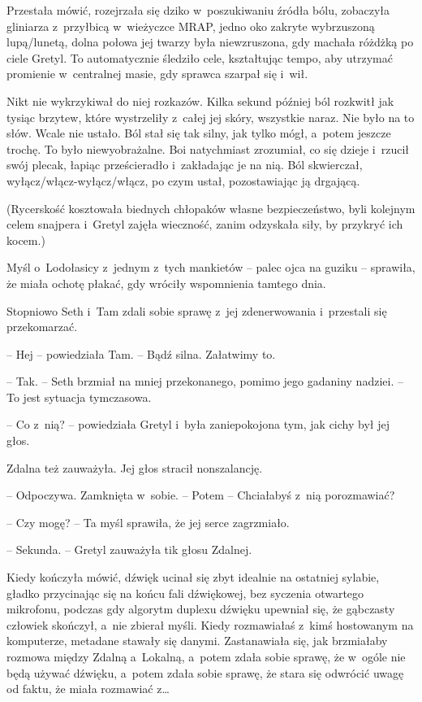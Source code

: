 \documentclass[oneside,polish,11pt,sfheadings]{mwbk}
\begin{document}
Przestała mówić, rozejrzała się dziko w~poszukiwaniu źródła bólu,
zobaczyła gliniarza z~przyłbicą w~wieżyczce MRAP, jedno oko zakryte
wybrzuszoną lupą/lunetą, dolna połowa jej twarzy była niewzruszona, gdy
machała różdżką po ciele Gretyl. To automatycznie śledziło cele,
kształtując tempo, aby utrzymać promienie w~centralnej masie, gdy
sprawca szarpał się i~wił.

Nikt nie wykrzykiwał do niej rozkazów. Kilka sekund później ból rozkwitł
jak tysiąc brzytew, które wystrzeliły z~całej jej skóry, wszystkie
naraz. Nie było na to słów. Wcale nie ustało. Ból stał się tak silny,
jak tylko mógł, a~potem jeszcze trochę. To było niewyobrażalne. Boi
natychmiast zrozumiał, co się dzieje i~rzucił swój plecak, łapiąc
prześcieradło i~zakładając je na nią. Ból skwierczał,
wyłącz/włącz-wyłącz/włącz, po czym ustał, pozostawiając ją drgającą.

(Rycerskość kosztowała biednych chłopaków własne bezpieczeństwo, byli
kolejnym celem snajpera i~Gretyl zajęła wieczność, zanim odzyskała siły,
by przykryć ich kocem.)

Myśl o~Lodołasicy z~jednym z~tych mankietów -- palec ojca na guziku -- sprawiła, że miała ochotę płakać, gdy wróciły wspomnienia tamtego dnia.

Stopniowo Seth i~Tam zdali sobie sprawę z~jej zdenerwowania i~przestali
się przekomarzać. 

-- Hej -- powiedziała Tam. -- Bądź silna. Załatwimy to.

-- Tak. -- Seth brzmiał na mniej przekonanego, pomimo jego gadaniny
nadziei. -- To jest sytuacja tymczasowa.

-- Co z~nią? -- powiedziała Gretyl i~była zaniepokojona tym, jak cichy był
jej głos.

Zdalna też zauważyła. Jej głos stracił nonszalancję. 

-- Odpoczywa. Zamknięta w~sobie. -- Potem -- Chciałabyś z~nią porozmawiać?

-- Czy mogę? -- Ta myśl sprawiła, że jej serce zagrzmiało.

-- Sekunda. -- Gretyl zauważyła tik głosu Zdalnej. 

Kiedy kończyła mówić,
dźwięk ucinał się zbyt idealnie na ostatniej sylabie, gładko przycinając
się na końcu fali dźwiękowej, bez syczenia otwartego mikrofonu, podczas
gdy algorytm duplexu dźwięku upewniał się, że gąbczasty człowiek
skończył, a~nie zbierał myśli. Kiedy rozmawiałaś z~kimś hostowanym na
komputerze, metadane stawały się danymi. Zastanawiała się, jak
brzmiałaby rozmowa między Zdalną a~Lokalną, a~potem zdała sobie sprawę,
że w~ogóle nie będą używać dźwięku, a~potem zdała sobie sprawę, że stara
się odwrócić uwagę od faktu, że miała rozmawiać z\ldots 
\end{document}
